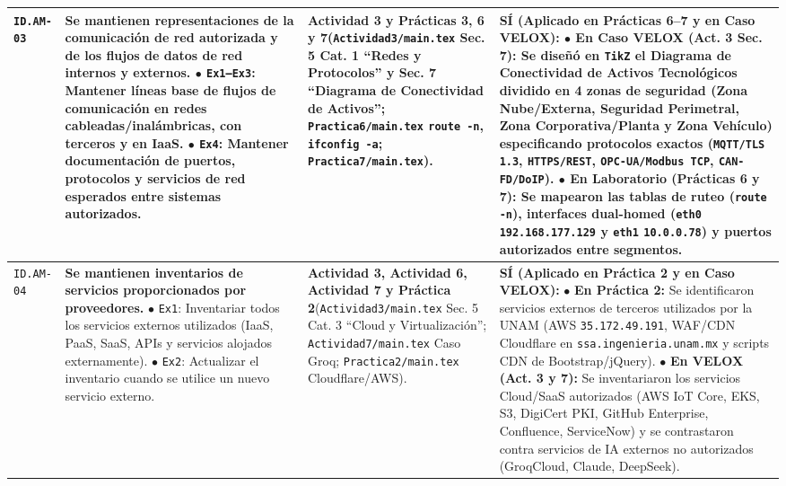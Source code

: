 \documentclass[letterpaper,11pt]{article}
\begin{document}
\begin{longtable}{|C{1.5cm}|L{5.3cm}|L{4.3cm}|L{5.8cm}|}
\texttt{ID.AM-03} &
\textbf{Se mantienen representaciones de la comunicación de red autorizada y de los flujos de datos de red internos y externos.}\newline
$\bullet$ \texttt{Ex1--Ex3}: Mantener líneas base de flujos de comunicación en redes cableadas/inalámbricas, con terceros y en IaaS.\newline
$\bullet$ \texttt{Ex4}: Mantener documentación de puertos, protocolos y servicios de red esperados entre sistemas autorizados. &
\textbf{Actividad 3 y Prácticas 3, 6 y 7}\newline (\texttt{Actividad3/main.tex} Sec. 5 Cat. 1 ``Redes y Protocolos'' y Sec. 7 ``Diagrama de Conectividad de Activos''; \texttt{Practica6/main.tex} \texttt{route -n}, \texttt{ifconfig -a}; \texttt{Practica7/main.tex}). &
\textbf{SÍ (Aplicado en Prácticas 6--7 y en Caso VELOX):}\newline
$\bullet$ \textbf{En Caso VELOX (Act. 3 Sec. 7):} Se diseñó en \texttt{TikZ} el \textbf{Diagrama de Conectividad de Activos Tecnológicos} dividido en 4 zonas de seguridad (Zona Nube/Externa, Seguridad Perimetral, Zona Corporativa/Planta y Zona Vehículo) especificando protocolos exactos (\texttt{MQTT/TLS 1.3}, \texttt{HTTPS/REST}, \texttt{OPC-UA/Modbus TCP}, \texttt{CAN-FD/DoIP}).\newline
$\bullet$ \textbf{En Laboratorio (Prácticas 6 y 7):} Se mapearon las tablas de ruteo (\texttt{route -n}), interfaces dual-homed (\texttt{eth0} \texttt{192.168.177.129} y \texttt{eth1} \texttt{10.0.0.78}) y puertos autorizados entre segmentos. \\
\hline

\texttt{ID.AM-04} &
\textbf{Se mantienen inventarios de servicios proporcionados por proveedores.}\newline
$\bullet$ \texttt{Ex1}: Inventariar todos los servicios externos utilizados (IaaS, PaaS, SaaS, APIs y servicios alojados externamente).\newline
$\bullet$ \texttt{Ex2}: Actualizar el inventario cuando se utilice un nuevo servicio externo. &
\textbf{Actividad 3, Actividad 6, Actividad 7 y Práctica 2}\newline (\texttt{Actividad3/main.tex} Sec. 5 Cat. 3 ``Cloud y Virtualización''; \texttt{Actividad7/main.tex} Caso Groq; \texttt{Practica2/main.tex} Cloudflare/AWS). &
\textbf{SÍ (Aplicado en Práctica 2 y en Caso VELOX):}\newline
$\bullet$ \textbf{En Práctica 2:} Se identificaron servicios externos de terceros utilizados por la UNAM (AWS \texttt{35.172.49.191}, WAF/CDN Cloudflare en \texttt{ssa.ingenieria.unam.mx} y scripts CDN de Bootstrap/jQuery).\newline
$\bullet$ \textbf{En VELOX (Act. 3 y 7):} Se inventariaron los servicios Cloud/SaaS autorizados (AWS IoT Core, EKS, S3, DigiCert PKI, GitHub Enterprise, Confluence, ServiceNow) y se contrastaron contra servicios de IA externos no autorizados (GroqCloud, Claude, DeepSeek). \\
\hline


\end{longtable}
\end{document}
